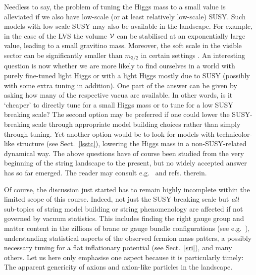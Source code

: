 \documentclass[12pt]{article}
\numberwithin{equation}{section}
\begin{document}
Needless to say, the problem of tuning the Higgs mass to a small value is alleviated if we also have low-scale (or at least relatively low-scale) SUSY. Such models with low-scale SUSY may also be available in the landscape. For example, in the case of the LVS the volume ${\cal V}$ can be stabilised at an exponentially large value, leading to a small gravitino mass. Moreover, the soft scale in the visible sector can be significantly smaller than $m_{3/2}$ in certain settings \cite{Aparicio:2014wxa}. An interesting question is now whether we are more likely to find ourselves in a world with purely fine-tuned light Higgs or with a light Higgs mostly due to SUSY (possibly with some extra tuning in addition). One part of the answer can be given by asking how many of the respective vacua are available. In other words, is it `cheaper' to directly tune for a small Higgs mass or to tune for a low SUSY breaking scale? The second option may be preferred if one could lower the SUSY-breaking scale through appropriate model building choices rather than simply through tuning. Yet another option would be to look for models with technicolor-like structure (see Sect.~\ref{lsstc}), lowering the Higgs mass in a non-SUSY-related dynamical way. The above questions have of course been studied from the very beginning of the string landscape to the present, but no widely accepted answer has so far emerged. The reader may consult e.g.~\cite{Denef:2004cf, Susskind:2004uv, Douglas:2004qg, Giudice:2006sn, Acharya:2008zi, Baer:2019zfl, Baer:2020kwz, Broeckel:2020fdz} and refs. therein.

Of course, the discussion just started has to remain highly incomplete within the limited scope of this course. Indeed, not just the SUSY breaking scale but {\it all} sub-topics of string model building or string phenomenology are affected if not governed by vacuum statistics. This includes finding the right gauge group and matter content in the zillions of brane or gauge bundle configurations (see e.g.~\cite{Lebedev:2006kn, Anderson:2011ns, Gmeiner:2005vz}), understanding statistical aspects of the observed fermion mass patters, a possibly necessary tuning for a flat inflationary potential (see Sect.~\ref{sri}), and many others. Let us here only emphasise one aspect because it is particularly timely: The apparent genericity of axions and axion-like particles in the landscape.
\end{document}
